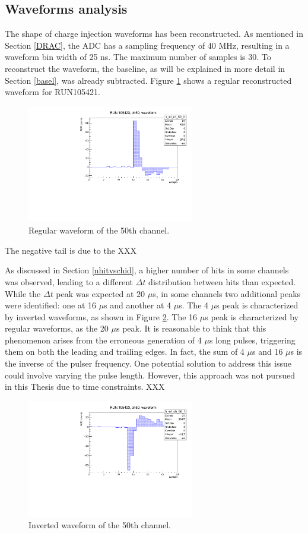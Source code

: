 \subsection{Waveforms analysis}\label{wf}
The shape of charge injection waveforms has been reconstructed. As mentioned in Section \ref{DRAC}, 
the ADC has a sampling frequency of 40 MHz, resulting in a waveform bin width of 25 ns. 
The maximum number of samples is 30. To reconstruct the waveform, the baseline, as will be 
explained in more detail in Section \ref{basel}, was already subtracted.
Figure \ref{fig:normalwf} shows a regular reconstructed waveform for RUN105421.
\begin{figure}[!h]
  \centering
  \includegraphics[width=0.65\textwidth]{figures/pdf/wf_ch50_0.pdf}
  \caption{Regular waveform of the 50th channel.}
 \label{fig:normalwf}
\end{figure}
The negative tail is due to the XXX

As discussed in Section \ref{nhitvschid}, a higher number of hits in some channels was observed, 
leading to a different $\Delta t$ distribution between hits than expected. 
While the $\Delta t$ peak was expected at 20 $\mu$s, in some channels two additional peaks were identified: 
one at 16 $\mu$s and another at 4 $\mu$s. The 4 $\mu$s peak is characterized by inverted waveforms, as shown in Figure \ref{fig:inverted}. 
The 16 $\mu$s peak is characterized by regular waveforms, as the 20 $\mu$s peak.
It is reasonable to think that this phenomenon arises from the erroneous generation of 4 $\mu$s long pulses, 
triggering them on both the leading and trailing edges. In fact, the sum of 4 $\mu$s and 16 $\mu$s is the inverse of the pulser frequency. 
One potential solution to address this issue could involve varying the pulse length. 
However, this approach was not pursued in this Thesis due to time constraints.
XXX
\begin{figure}[!h]
  \centering
  \includegraphics[width=0.65\textwidth]{figures/pdf/wf_ch50_1.pdf}
  \caption{Inverted waveform of the 50th channel.}
 \label{fig:inverted}
\end{figure}
